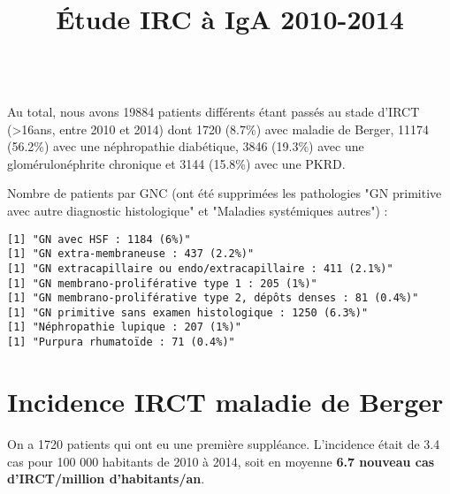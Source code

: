 \documentclass[11pt,a4paper]{article}\usepackage[]{graphicx}\usepackage[]{color}
\title{Étude IRC à IgA 2010-2014}
\makeatletter
\newenvironment{kframe}{%
 \def\at@end@of@kframe{}%
 \ifinner\ifhmode%
  \def\at@end@of@kframe{\end{minipage}}%
  \begin{minipage}{\columnwidth}%
 \fi\fi%
 \def\FrameCommand##1{\hskip\@totalleftmargin \hskip-\fboxsep
 \colorbox{shadecolor}{##1}\hskip-\fboxsep
     \hskip-\linewidth \hskip-\@totalleftmargin \hskip\columnwidth}%
 \MakeFramed {\advance\hsize-\width
   \@totalleftmargin\z@ \linewidth\hsize
   \@setminipage}}%
 {\par\unskip\endMakeFramed%
 \at@end@of@kframe}
\newenvironment{knitrout}{}{} %
\makeatother
\begin{document}
\maketitle

\tableofcontents
~\\























Au total, nous avons 19884 patients différents étant passés au stade d'IRCT (\textgreater 16ans, entre 2010 et 2014) dont 1720 (8.7\%) avec maladie de Berger, 11174 (56.2\%) avec une néphropathie diabétique, 3846 (19.3\%) avec une glomérulonéphrite chronique et 3144 (15.8\%) avec une PKRD.

Nombre de patients par GNC (ont été supprimées les pathologies "GN primitive avec autre diagnostic histologique" et "Maladies systémiques autres") :

\begin{knitrout}
\color{fgcolor}\begin{kframe}
\begin{verbatim}
[1] "GN avec HSF : 1184 (6%)"
[1] "GN extra-membraneuse : 437 (2.2%)"
[1] "GN extracapillaire ou endo/extracapillaire : 411 (2.1%)"
[1] "GN membrano-proliférative type 1 : 205 (1%)"
[1] "GN membrano-proliférative type 2, dépôts denses : 81 (0.4%)"
[1] "GN primitive sans examen histologique : 1250 (6.3%)"
[1] "Néphropathie lupique : 207 (1%)"
[1] "Purpura rhumatoïde : 71 (0.4%)"
\end{verbatim}
\end{kframe}
\end{knitrout}

\section{Incidence IRCT maladie de Berger}



On a 1720 patients qui ont eu une première suppléance. L'incidence était de 3.4 cas pour 100 000 habitants de 2010 à 2014, soit en moyenne \textbf{6.7 nouveau cas d'IRCT/million d'habitants/an}. 
\end{document}
